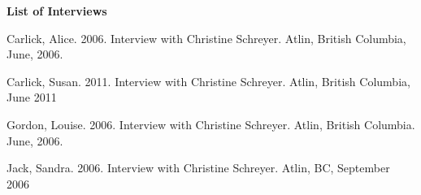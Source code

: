 \begin{center}
\textbf{List of Interviews}
\end{center}

\begin{hang}
Carlick, Alice. 2006. Interview with Christine Schreyer. Atlin, British Columbia, June, 2006.

Carlick, Susan. 2011. Interview with Christine Schreyer. Atlin, British Columbia, June 2011

Gordon, Louise. 2006. Interview with Christine Schreyer. Atlin, British Columbia. June, 2006.

Jack, Sandra. 2006. Interview with Christine Schreyer. Atlin, BC, September 2006

\end{hang}

\bigskip


\label{schreyer-ch-end}
